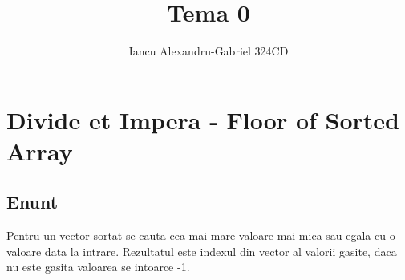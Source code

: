 \documentclass[runningheads]{llncs}
\begin{document}
\lstset{
	tabsize = 2,
}
\title{Tema 0}
\author{Iancu Alexandru-Gabriel 324CD}

\maketitle

\section{Divide et Impera - Floor of Sorted Array}
\subsection{Enunt}
Pentru un vector sortat se cauta cea mai mare valoare mai mica sau egala cu o valoare data la intrare. Rezultatul
este indexul din vector al valorii gasite, daca nu este gasita valoarea se intoarce -1.
\end{document}
